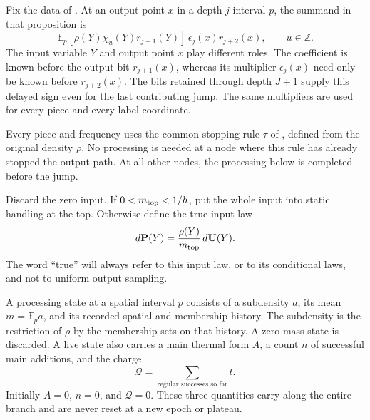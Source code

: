 Fix the data of . At an output point $x$ in a depth-$j$
interval $p$, the summand in that proposition is
\begin{equation}
 \mathbb E_p[\rho(Y)\chi_u(Y)r_{j+1}(Y)]\,
       \epsilon_j(x)r_{j+2}(x),\qquad u\in\mathbb Z.
 \label{eq:source-11}
\end{equation}
The input variable $Y$ and output point $x$ play different roles. The
coefficient is known before the output bit $r_{j+1}(x)$, whereas its
multiplier $\epsilon_j(x)$ need only be known before $r_{j+2}(x)$.
The bits retained through depth $J+1$ supply this delayed sign even for
the last contributing jump. The same multipliers are used for every piece
and every label coordinate.

Every piece and frequency uses the common stopping rule $\tau$ of
, defined from the original density $\rho$. No processing
is needed at a node where this rule has already stopped the output path.
At all other nodes, the processing below is completed before the jump.

Discard the zero input.  If $0<m_{\rm top}<1/h$, put the whole input
into static handling at the top.  Otherwise define the true input law
\[
 d\mathbf P(Y)=\frac{\rho(Y)}{m_{\rm top}}\,d\mathbf U(Y).
\]
The word ``true'' will always refer to this input law, or to its
conditional laws, and not to uniform output sampling.

A processing state at a spatial interval $p$ consists of a subdensity
$a$, its mean $m=\mathbb E_p a$, and its recorded spatial and membership
history.  The subdensity is the restriction of $\rho$ by the membership
sets on that history.  A zero-mass state is discarded.  A live state
also carries a main thermal form $A$, a count $n$ of successful main
additions, and the charge
\[
 \mathcal Q=\sum_{\text{regular successes so far}}t.
\]
Initially $A=0$, $n=0$, and $\mathcal Q=0$.  These three quantities
carry along the entire branch and are never reset at a new epoch or
plateau.

